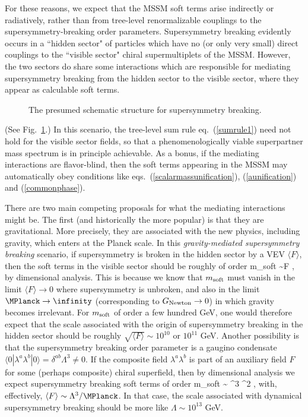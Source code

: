 For these reasons, we expect that the MSSM soft terms arise
indirectly or radiatively, rather than from tree-level renormalizable
couplings to
the supersymmetry-breaking order parameters. Supersymmetry
breaking evidently occurs
in a ``hidden sector" of particles which have no (or only very
small) direct couplings to the ``visible sector"
chiral supermultiplets of the MSSM. However, the two sectors do share
some interactions which are responsible for mediating supersymmetry
breaking from the hidden sector to the visible sector, where they
appear as calculable soft terms.
\begin{figure}
\centerline{}
\caption{The presumed schematic structure for supersymmetry breaking.
\label{fig:structure}}
\end{figure}
(See Fig.~\ref{fig:structure}.)
In this scenario, the tree-level sum rule eq.~(\ref{sumrule1})
need not hold for the visible sector fields, so that a
phenomenologically viable superpartner mass spectrum is in principle
achievable. As a bonus, if the mediating
interactions are flavor-blind, then the soft terms appearing in the MSSM
may automatically obey conditions like
eqs.~(\ref{scalarmassunification}), (\ref{aunification}) and
(\ref{commonphase}). 

There are two main competing proposals
for what the mediating interactions might be. The first (and historically
the more popular) is that they are gravitational. More
precisely, they are
associated with the new physics, including gravity, which enters at the
Planck scale.
In this {\it gravity-mediated supersymmetry breaking} scenario,
if supersymmetry is
broken in the hidden sector by a VEV $\langle
F\rangle$, then the soft terms in the visible sector should be roughly
of order
\beq
m_{\rm soft} \sim {\langle F \rangle\over \MPlanck},
\label{mgravusual}
\eeq
by dimensional analysis.
This is because we
know that $m_{\rm soft}$
must vanish in the limit $\langle F \rangle \rightarrow 0$
where supersymmetry is unbroken, and also in the
limit $\MPlanck \rightarrow \infinity$ (corresponding to $G_{\rm Newton}
\rightarrow 0$) in which gravity becomes irrelevant.
For $m_{\rm soft}$ of order a few hundred GeV, one would therefore expect
that
the scale
associated with the origin of supersymmetry breaking in the
hidden sector should be roughly ${\sqrt{\langle F\rangle}} \sim 10^{10}$
or $10^{11}$ GeV.
Another possibility is that the supersymmetry breaking order
parameter is a gaugino condensate $\langle 0| \lambda^a \lambda^b
|0 \rangle = \delta^{ab} \Lambda^3\not= 0$.
If the composite field $\lambda^a\lambda^b$ is part of
an auxiliary field $F$ for some (perhaps composite) chiral
superfield,
then by dimensional analysis we expect supersymmetry breaking
soft terms of order
\beq
m_{\rm soft} \sim
{\Lambda^3 \over \MPlanck^2} ,
\label{foofighters}
\eeq
with, effectively, $\langle F \rangle \sim \Lambda^3/\MPlanck$.
In that case, the scale associated with dynamical supersymmetry
breaking should be more like $\Lambda \sim 10^{13} $ GeV.

